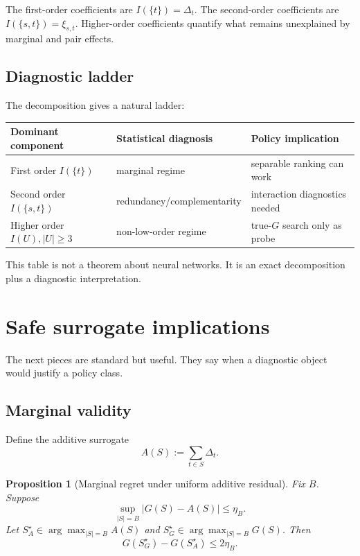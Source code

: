 \documentclass[11pt]{article}
\newtheorem{proposition}{Proposition}
\newcommand{\1}{\mathbf 1}
\begin{document}
The first-order coefficients are \(I(\{t\})=\Delta_t\).  The second-order
coefficients are \(I(\{s,t\})=\xi_{s,t}\).  Higher-order coefficients quantify
what remains unexplained by marginal and pair effects.

\subsection{Diagnostic ladder}

The decomposition gives a natural ladder:

\begin{center}
\begin{tabular}{lll}
\toprule
Dominant component & Statistical diagnosis & Policy implication \\
\midrule
First order \(I(\{t\})\) & marginal regime & separable ranking can work \\
Second order \(I(\{s,t\})\) & redundancy/complementarity & interaction diagnostics needed \\
Higher order \(I(U), |U|\ge3\) & non-low-order regime & true-\(G\) search only as probe \\
\bottomrule
\end{tabular}
\end{center}

This table is not a theorem about neural networks.  It is an exact
decomposition plus a diagnostic interpretation.

\section{Safe surrogate implications}

The next pieces are standard but useful.  They say when a diagnostic object
would justify a policy class.

\subsection{Marginal validity}

Define the additive surrogate
\[
  A(S):=\sum_{t\in S}\Delta_t.
\]

\begin{proposition}[Marginal regret under uniform additive residual]
Fix \(B\).  Suppose
\[
  \sup_{|S|=B}|G(S)-A(S)|\le \eta_B.
\]
Let \(S_A^\star\in\arg\max_{|S|=B}A(S)\) and
\(S_G^\star\in\arg\max_{|S|=B}G(S)\).  Then
\[
  G(S_G^\star)-G(S_A^\star)\le 2\eta_B.
\]
\end{proposition}
\end{document}
